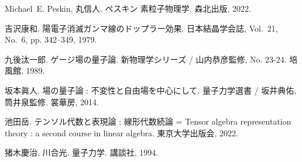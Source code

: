 \documentclass[dvipdfmx, a4paper]{jsarticle}
\theoremstyle{break}
\begin{document}
\begin{thebibliography}{慶光94}
Michael~E. Peskin, 丸信人.
\newblock ペスキン 素粒子物理学.
\newblock 森北出版, 2022.





吉沢康和.
\newblock 陽電子消滅ガンマ線のドップラー効果.
\newblock 日本結晶学会誌, Vol.~21, No.~6, pp. 342--349, 1979.

九後汰一郎.
\newblock ゲージ場の量子論.
\newblock 新物理学シリーズ / 山内恭彦監修, No. 23-24. 培風館, 1989.

坂本眞人.
\newblock 場の量子論 : 不変性と自由場を中心にして.
\newblock 量子力学選書 / 坂井典佑, 筒井泉監修. 裳華房, 2014.

池田岳.
\newblock テンソル代数と表現論 : 線形代数続論 = Tensor algebra representation
  theory : a second course in linear algebra.
\newblock 東京大学出版会, 2022.

猪木慶治, 川合光.
\newblock 量子力学.
\newblock 講談社, 1994.
\end{thebibliography}
%
%
%
\end{document}

